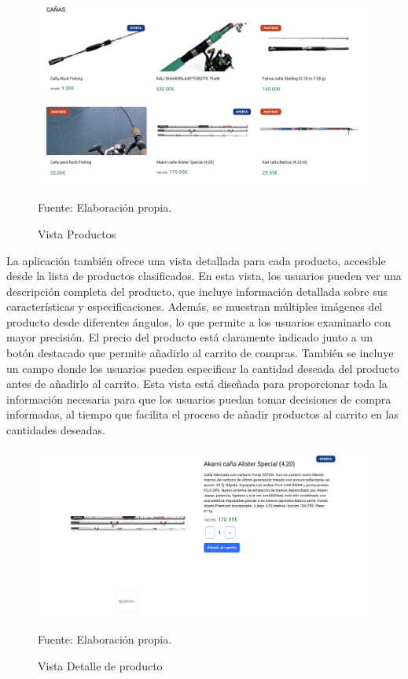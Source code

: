 \begin{figure}[H]
\begin{center}
\includegraphics[scale=0.40]{./Images/vistaProductos.png}
\caption{Vista Productos} Fuente: Elaboración propia.

\label{fig:fig2}

\end{center}
\end{figure}


La aplicación también ofrece una vista detallada para cada producto, accesible desde la lista de productos clasificados. En esta vista, los usuarios pueden ver una descripción completa del producto, que incluye información detallada sobre sus características y especificaciones. Además, se muestran múltiples imágenes del producto desde diferentes ángulos, lo que permite a los usuarios examinarlo con mayor precisión. El precio del producto está claramente indicado junto a un botón destacado que permite añadirlo al carrito de compras. También se incluye un campo donde los usuarios pueden especificar la cantidad deseada del producto antes de añadirlo al carrito. Esta vista está diseñada para proporcionar toda la información necesaria para que los usuarios puedan tomar decisiones de compra informadas, al tiempo que facilita el proceso de añadir productos al carrito en las cantidades deseadas.


\begin{figure}[H]
\begin{center}
\includegraphics[scale=0.5]{./Images/vistaDetalleProducto.png}
\caption{Vista Detalle de producto} Fuente: Elaboración propia.

\label{fig:fig1}

\end{center}
\end{figure}

